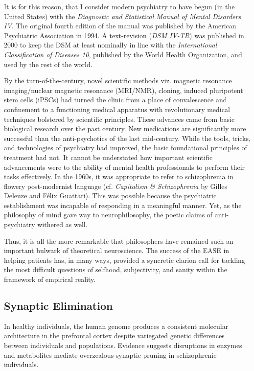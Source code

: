\documentclass[]{article}
\begin{document}
		It is for this reason, that I consider modern psychiatry to have begun (in the United States) with the \textit{Diagnostic and Statistical Manual of Mental Disorders IV}. The original fourth edition of the manual was published by the American Psychiatric Association in 1994. A text-revision (\textit{DSM IV-TR}) was published in 2000 to keep the DSM at least nominally in line with the \textit{International Classification of Diseases 10}, published by the World Health Organization, and used by the rest of the world.
		
		By the turn-of-the-century, novel scientific methods viz. magnetic resonance imaging/nuclear magnetic resonance (MRI/NMR), cloning, induced pluripotent stem cells (iPSCs) had turned the clinic from a place of convalescence and confinement to a functioning medical apparatus with revolutionary medical techniques bolstered by scientific principles. These advances came from basic biological research over the past century. New medications are significantly more successful than the  anti-psychotics of the last mid-century. While the tools, tricks, and technologies of psychiatry had improved, the basic foundational principles of treatment had not. It cannot be understated how important scientific advancements were to the ability of mental health professionals to perform their tasks effectively. In the 1960s, it was appropriate to refer to schizophrenia in flowery post-modernist language (cf. \textit{Capitalism \& Schizophrenia} by Gilles Deleuze and F\'elix Guattari). This was possible because the psychiatric establishment was incapable of responding in a meaningful manner. Yet, as the philosophy of mind gave way to neurophilosophy, the poetic claims of anti-psychiatry withered as well.
		
		Thus, it is all the more remarkable that philosophers have remained such an important bulwark of theoretical neuroscience. The success of the EASE in helping patients has, in many ways, provided a syncretic clarion call for tackling the most difficult questions of selfhood, subjectivity, and sanity within the framework of empirical reality.
		
		
	\subsection{Synaptic Elimination}
		
		In healthy individuals, the human genome produces a consistent molecular architecture in the prefrontal cortex despite variegated genetic differences between individuals and populations. Evidence suggests disruptions in enzymes and metabolites mediate overzealous synaptic pruning in schizophrenic individuals.
		
\end{document}
